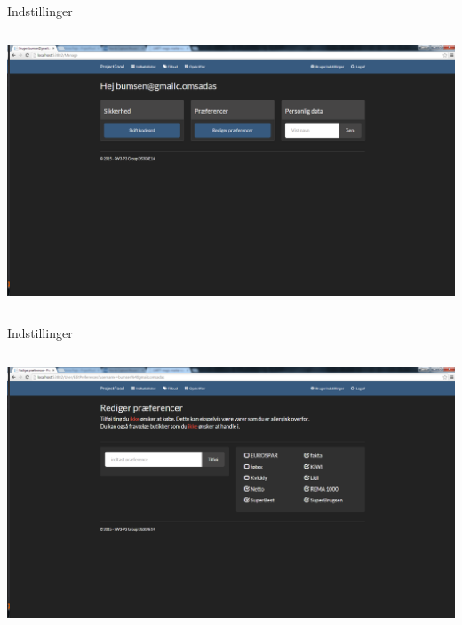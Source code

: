 \begin{frame}{Indstillinger}

	
	\begin{minipage}[0.3\textheight]{\textwidth}
	\begin{columns}[T]
	\begin{column}{1\textwidth}
	 \includegraphics[width=1\textwidth,height=1\textheight,keepaspectratio, trim={1cm 0 0 16mm}, clip]{images/Screenshots/SettingsOld.png}
	
	\end{column}

	\end{columns}

  \end{minipage}
	
\end{frame}
\begin{frame}{Indstillinger}

	
	\begin{minipage}[0.3\textheight]{\textwidth}
	\begin{columns}[T]
	\begin{column}{1\textwidth}
	 \includegraphics[width=1\textwidth,height=1\textheight,keepaspectratio, trim={1cm 0 0 16mm}, clip]{images/Screenshots/SettingsOld2.png}
	
	\end{column}

	\end{columns}

  \end{minipage}
	
\end{frame}

